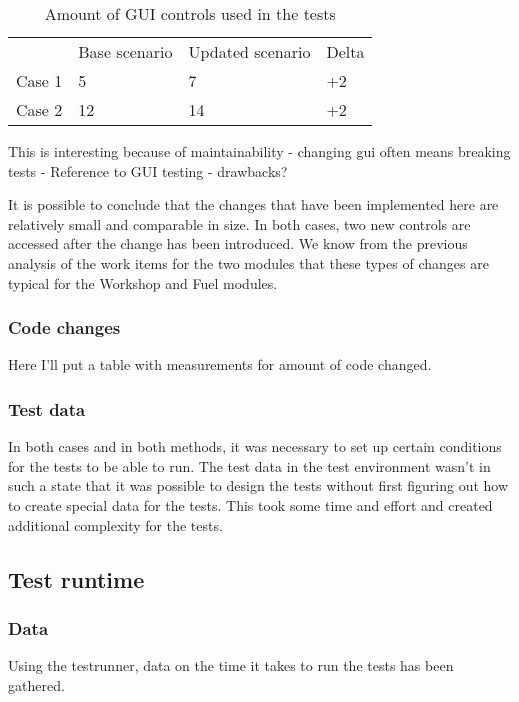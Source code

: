 \documentclass{article}
\begin{document}
			\begin{table}[h!]
				\begin{tabular}{l l l l}
				        & Base scenario & Updated scenario & Delta\\
				 Case 1 & 5      & 7     & +2 \\
				 Case 2 & 12     & 14    & +2 \\
				 \end{tabular}
				 \caption{Amount of GUI controls used in the tests}
			 \end{table}

			 This is interesting because of maintainability - changing gui often means breaking tests - Reference to GUI testing - drawbacks?

			 It is possible to conclude that the changes that have been implemented here are relatively small and comparable in size. In both cases, two new controls are accessed after the change has been introduced. We know from the previous analysis of the work items for the two modules that these types of changes are typical for the Workshop and Fuel modules.

			 \subsubsection{Code changes}

			 Here I'll put a table with measurements for amount of code changed.

			 \subsubsection{Test data}
			 In both cases and in both methods, it was necessary to set up certain conditions for the tests to be able to run. The test data in the test environment wasn't in such a state that it was possible to design the tests without first figuring out how to create special data for the tests. This took some time and effort and created additional complexity for the tests. 

		\subsection{Test runtime}

			\subsubsection{Data}
			Using the testrunner, data on the time it takes to run the tests has been gathered. 
\end{document}
